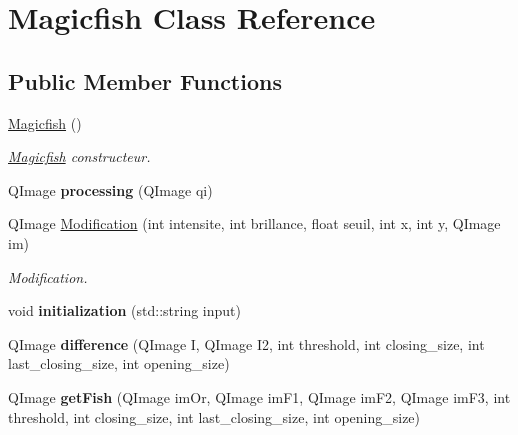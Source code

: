 \hypertarget{classMagicfish}{\section{Magicfish Class Reference}
\label{classMagicfish}
}
\subsection*{Public Member Functions}
\begin{DoxyCompactItemize}
\item 
\hypertarget{classMagicfish_a4d4ad0aa6941821a56d1a015671b1c65}{\hyperlink{classMagicfish_a4d4ad0aa6941821a56d1a015671b1c65}{Magicfish} ()}\label{classMagicfish_a4d4ad0aa6941821a56d1a015671b1c65}

\begin{DoxyCompactList}\small\item\em \hyperlink{classMagicfish}{Magicfish} constructeur. \end{DoxyCompactList}\item 
\hypertarget{classMagicfish_a90ff3fb674ad6910912e93e4356581ad}{Q\-Image {\bfseries processing} (Q\-Image qi)}\label{classMagicfish_a90ff3fb674ad6910912e93e4356581ad}

\item 
Q\-Image \hyperlink{classMagicfish_aca3e8f97bfb995fbcd504cc79369cec9}{Modification} (int intensite, int brillance, float seuil, int x, int y, Q\-Image im)
\begin{DoxyCompactList}\small\item\em Modification. \end{DoxyCompactList}\item 
\hypertarget{classMagicfish_a041b2e4933fac43533bf358f6eadb1af}{void {\bfseries initialization} (std\-::string input)}\label{classMagicfish_a041b2e4933fac43533bf358f6eadb1af}

\item 
\hypertarget{classMagicfish_af5fc5198309c895a1961954cc4eff4c9}{Q\-Image {\bfseries difference} (Q\-Image I, Q\-Image I2, int threshold, int closing\-\_\-size, int last\-\_\-closing\-\_\-size, int opening\-\_\-size)}\label{classMagicfish_af5fc5198309c895a1961954cc4eff4c9}

\item 
\hypertarget{classMagicfish_ac5e098b5e72687bfade751eaf4a03a55}{Q\-Image {\bfseries get\-Fish} (Q\-Image im\-Or, Q\-Image im\-F1, Q\-Image im\-F2, Q\-Image im\-F3, int threshold, int closing\-\_\-size, int last\-\_\-closing\-\_\-size, int opening\-\_\-size)}\label{classMagicfish_ac5e098b5e72687bfade751eaf4a03a55}


\end{DoxyCompactItemize}
